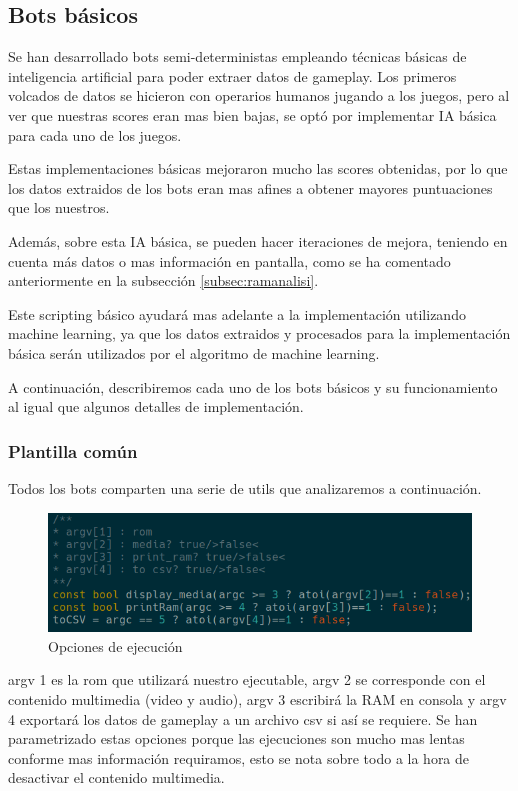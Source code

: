\newpage
\subsection{Bots básicos}
\label{subsec:botsbasicos}
Se han desarrollado bots semi-deterministas empleando técnicas básicas de inteligencia artificial para poder extraer datos de gameplay. Los primeros volcados de datos se hicieron con operarios humanos jugando a los juegos, pero al ver que nuestras scores eran mas bien bajas, se optó por implementar IA básica para cada uno de los juegos. 

Estas implementaciones básicas mejoraron mucho las scores obtenidas, por lo que los datos extraidos de los bots eran mas afines a obtener mayores puntuaciones que los nuestros.

Además, sobre esta IA básica, se pueden hacer iteraciones de mejora, teniendo en cuenta más datos o mas información en pantalla, como se ha comentado anteriormente en la subsección \ref{subsec:ramanalisi}.

Este scripting básico ayudará mas adelante a la implementación utilizando machine learning, ya que los datos extraidos y procesados para la implementación básica serán utilizados por el algoritmo de machine learning.

A continuación, describiremos cada uno de los bots básicos y su funcionamiento al igual que algunos detalles de implementación.

\subsubsection{Plantilla común}
\label{subsec:botsbasicos:plantcomun}
Todos los bots comparten una serie de utils que analizaremos a continuación.

\begin{figure}[h]
	\centering
	\includegraphics[width=1\textwidth]{Figures/ALEMediaSettings}
	\caption{Opciones de ejecución}
	\label{fig:ALEMediaSettings}
\end{figure}

argv 1 es la rom que utilizará nuestro ejecutable, argv 2 se corresponde con el contenido multimedia (video y audio), argv 3 escribirá la RAM en consola y argv 4 exportará los datos de gameplay a un archivo \ac{csv} si así se requiere. Se han parametrizado estas opciones porque las ejecuciones son mucho mas lentas conforme mas información requiramos, esto se nota sobre todo a la hora de desactivar el contenido multimedia.

